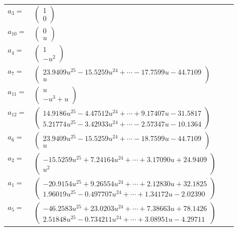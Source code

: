 \documentclass[1p]{elsarticle_modified}
\theoremstyle{definition}
\begin{document}
\begin{tabular}{m{7pt} m{180pt} m{7pt} m{180pt} }
\flushright $a_{3}=$&$\begin{pmatrix}1\\0\end{pmatrix}$ \\
\flushright $a_{10}=$&$\begin{pmatrix}0\\u\end{pmatrix}$ \\
\flushright $a_{4}=$&$\begin{pmatrix}1\\- u^2\end{pmatrix}$ \\
\flushright $a_{7}=$&$\begin{pmatrix}23.9409 u^{25}-15.5259 u^{24}+\cdots-17.7599 u-44.7109\\u\end{pmatrix}$ \\
\flushright $a_{11}=$&$\begin{pmatrix}u\\- u^3+u\end{pmatrix}$ \\
\flushright $a_{12}=$&$\begin{pmatrix}14.9186 u^{25}-4.47512 u^{24}+\cdots+9.17407 u-31.5817\\5.21774 u^{25}-3.42933 u^{24}+\cdots-2.57347 u-10.1364\end{pmatrix}$ \\
\flushright $a_{6}=$&$\begin{pmatrix}23.9409 u^{25}-15.5259 u^{24}+\cdots-18.7599 u-44.7109\\u\end{pmatrix}$ \\
\flushright $a_{2}=$&$\begin{pmatrix}-15.5259 u^{25}+7.24164 u^{24}+\cdots+3.17090 u+24.9409\\u^2\end{pmatrix}$ \\
\flushright $a_{1}=$&$\begin{pmatrix}-20.9154 u^{25}+9.26554 u^{24}+\cdots+2.12830 u+32.1825\\1.96019 u^{25}-0.497707 u^{24}+\cdots+1.34172 u-2.02390\end{pmatrix}$ \\
\flushright $a_{5}=$&$\begin{pmatrix}-46.2583 u^{25}+23.0203 u^{24}+\cdots+7.38663 u+78.1426\\2.51848 u^{25}-0.734211 u^{24}+\cdots+3.08951 u-4.29711\end{pmatrix}$ \\

\end{tabular}
\end{document}
